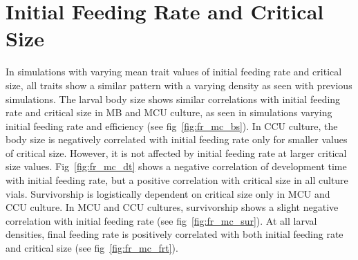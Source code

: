 \section{Initial Feeding Rate and Critical Size}
In simulations with varying mean trait values of initial feeding rate and critical size, all traits show a similar pattern with a varying density as seen with previous simulations. The larval body size shows similar correlations with initial feeding rate and critical size in MB and MCU culture, as seen in simulations varying initial feeding rate and efficiency (see fig~\ref{fig:fr_mc_bs}). In CCU culture, the body size is negatively correlated with initial feeding rate only for smaller values of critical size. However, it is not affected by initial feeding rate at larger critical size values. Fig~\ref{fig:fr_mc_dt} shows a negative correlation of development time with initial feeding rate, but a positive correlation with critical size in all culture vials. Survivorship is logistically dependent on critical size only in MCU and CCU culture. In MCU and CCU cultures, survivorship shows a slight negative correlation with initial feeding rate (see fig~\ref{fig:fr_mc_sur}). At all larval densities, final feeding rate is positively correlated with both initial feeding rate and critical size (see fig~\ref{fig:fr_mc_frt}).
